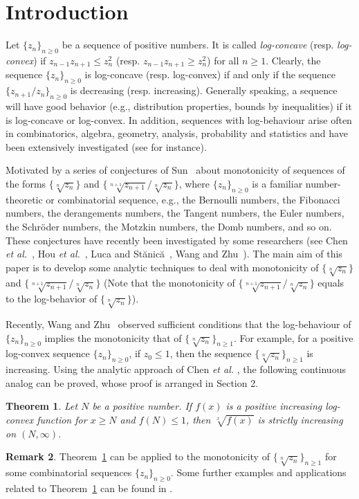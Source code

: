\documentclass[12pt,reqno]{article}
\newtheorem{thm}{Theorem}[section]
\theoremstyle{definition}
\newtheorem{rem}[thm]{Remark}
\numberwithin{equation}{section}
\begin{document}
\section{Introduction}
Let $\{z_n\}_{n\geq0}$ be a sequence of positive numbers. It is
called {\it log-concave} (resp. {\it log-convex}) if
$z_{n-1}z_{n+1}\le z_n^2$ (resp. $z_{n-1}z_{n+1}\ge z_n^2$) for all
$n\ge 1$. Clearly, the sequence $\{z_n\}_{n\ge 0}$ is log-concave
(resp. log-convex) if and only if the sequence
$\{z_{n+1}/z_n\}_{n\ge 0}$ is decreasing (resp. increasing).
Generally speaking, a sequence will have good behavior (e.g.,
distribution properties, bounds by inequalities) if it is
log-concave or log-convex. In addition, sequences with log-behaviour
arise often in combinatorics, algebra, geometry, analysis,
probability and statistics and have been extensively investigated
(see \cite{Bre94,LW07, Sta89,WY07,Zhu12} for instance).


Motivated by a series of conjectures of Sun~\cite{Sun-conj} about
monotonicity of sequences of the forms $\{\sqrt[n]{z_n}\}$ and
$\{\sqrt[n+1]{z_{n+1}}/\sqrt[n]{z_n}\}$, where $\{z_n\}_{n\ge 0}$ is
a familiar number-theoretic or combinatorial sequence, e.g., the
Bernoulli numbers, the Fibonacci numbers, the derangements numbers,
the Tangent numbers, the Euler numbers, the Schr\"oder numbers, the
Motzkin numbers, the Domb numbers, and so on. These conjectures have
recently been investigated by some researchers (see Chen {\it et
al.}~\cite{CGW,CGW1}, Hou {\it et al.}~\cite{HSW12}, Luca and
St\u{a}nic\u{a}~\cite{LS12}, Wang and Zhu~\cite{WZ13}). The main aim
of this paper is to develop  some analytic techniques to deal with
monotonicity of $\{\sqrt[n]{z_n}\}$ and
$\{\sqrt[n+1]{z_{n+1}}/\sqrt[n]{z_n}\}$ (Note that the monotonicity
of $\{\sqrt[n+1]{z_{n+1}}/\sqrt[n]{z_n}\}$ equals to the
log-behavior of $\{\sqrt[n]{z_n}\}$).

 Recently, Wang and
Zhu~\cite{WZ13} observed sufficient conditions that the
log-behaviour of $\{z_n\}_{n\ge 0}$ implies the monotonicity that of
$\{\sqrt[n]{z_n}\}_{n\ge 1}$. For example, for a positive log-convex
sequence $\{z_n\}_{n\ge 0}$, if $z_0\le 1$, then the sequence
$\{\sqrt[n]{z_n}\}_{n\ge 1}$ is increasing. Using the analytic
approach of Chen {\it et al.} \cite{CGW}, the following continuous
analog can be proved, whose proof is arranged in Section 2.
\begin{thm}\label{thm+inc}
Let $N$ be a positive number. If $f(x)$ is a positive increasing
log-convex function for $x\geq N$ and $f(N)\leq 1$, then
$\sqrt[x]{f(x)}$ is strictly increasing on $(N,\infty)$.
\end{thm}
\begin{rem}
Theorem~\ref{thm+inc} can be applied to the monotonicity of
$\{\sqrt[n]{z_n}\}_{n\ge 1}$ for some combinatorial sequences
$\{z_n\}_{n\ge 0}$. Some further examples and applications related
to Theorem~\ref{thm+inc} can be found in \cite{CGW}.
\end{rem}
\end{document}

